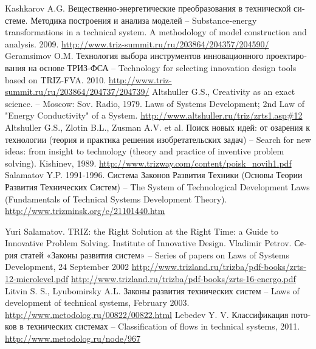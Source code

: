 \documentclass[a4paper,11pt]{article}
\begin{document}
\begin{thebibliography}{xxx}
 Kashkarov A.G.
  \foreignlanguage{russian}{Вещественно-энергетические преобразования в
    технической системе.  Методика построения и анализа моделей} --
  Substance-energy transformations in a technical system. A methodology of
  model construction and analysis. 2009.
  \url{http://www.triz-summit.ru/ru/203864/204357/204590/}
 Geramsimov O.M. \foreignlanguage{russian}{Технология выбора
  инструментов инновационного проектирования на основе ТРИЗ-ФСА} -- Technology
  for selecting innovation design tools based on TRIZ-FVA.  2010.
  \url{http://www.triz-summit.ru/ru/203864/204737/204739/}
 Altshuller G.S., Creativity as an exact science. -- Moscow:
  Sov. Radio, 1979. Laws of Systems Development; 2nd Law of "Energy
  Conductivity" of a System. \url{http://www.altshuller.ru/triz/zrts1.asp#12} 
 Altshuller G.S., Zlotin B.L., Zusman A.V. et al.
  \foreignlanguage{russian}{Поиск новых идей: от озарения к технологии (теория
    и практика решения изобретательских задач)} -- Search for new ideas: from
  insight to technology (theory and practice of inventive problem solving).
  Kishinev, 1989.
  \url{http://www.trizway.com/content/poisk_novih1.pdf}
 Salamatov Y.P. 1991-1996. \foreignlanguage{russian}{Система
  Законов Развития Техники (Основы Теории Развития Технических Систем)} -- The
  System of Technological Development Laws (Fundamentals of Technical Systems
  Development Theory).   \url{http://www.trizminsk.org/e/21101440.htm}

  Yuri Salamatov. TRIZ: the Right Solution at the Right Time: a Guide to
  Innovative Problem Solving.  Institute of Innovative Design.
 Vladimir Petrov. \foreignlanguage{russian}{Серия статей «Законы
  развития систем»} -- Series of papers on Laws of Systems Development, 24
  September 2002
  \url{http://www.trizland.ru/trizba/pdf-books/zrts-12-microlevel.pdf}
  \url{http://www.trizland.ru/trizba/pdf-books/zrts-16-energo.pdf}
 Litvin S. S., Lyubomirsky A.L. \foreignlanguage{russian}{Законы
  развития технических систем} -- Laws of development of technical systems,
  February 2003. \url{http://www.metodolog.ru/00822/00822.html}
 Lebedev Y. V. \foreignlanguage{russian}{Классификация потоков в
  технических системах} -- Classification of flows in technical systems, 2011.
  \url{http://www.metodolog.ru/node/967}
\end{thebibliography}
\end{document}
